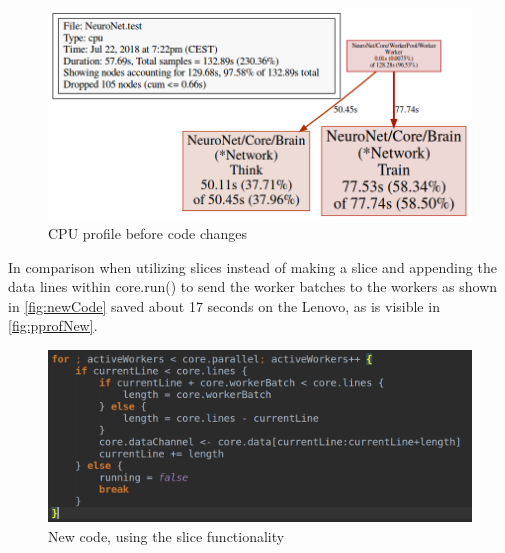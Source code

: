 \documentclass[11pt]{article}
\begin{document}
\begin{figure}[H]
	\centering
	\includegraphics[width=1.0\textwidth]{./Data/WrongMath/Images/pprofOld.png}
	\vspace{-1em}
	\caption{CPU profile before code changes}
	\vspace{-0.5em}
	\label{fig:pprofOld}
\end{figure}

In comparison when utilizing slices instead of making a slice and appending the data lines within core.run() to send the worker batches to the workers as shown in \autoref{fig:newCode} saved about 17 seconds on the Lenovo, as is visible in \autoref{fig:pprofNew}.

\begin{figure}[H]
	\centering
	\includegraphics[width=1.0\textwidth]{./Data/WrongMath/Images/newcode.png}
	\vspace{-1em}
	\caption{New code, using the slice functionality}
	\vspace{-0.5em}
	\label{fig:newCode}
\end{figure}
\end{document}
